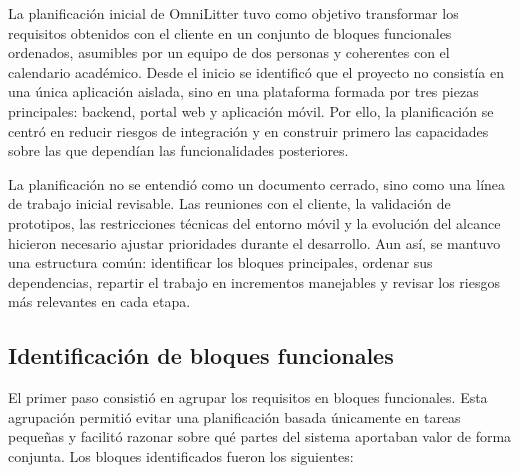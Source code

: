 La planificación inicial de OmniLitter tuvo como objetivo transformar los
requisitos obtenidos con el cliente en un conjunto de bloques funcionales
ordenados, asumibles por un equipo de dos personas y coherentes con el calendario
académico. Desde el inicio se identificó que el proyecto no consistía en una única
aplicación aislada, sino en una plataforma formada por tres piezas principales:
backend, portal web y aplicación móvil. Por ello, la planificación se centró en
reducir riesgos de integración y en construir primero las capacidades sobre las
que dependían las funcionalidades posteriores.

La planificación no se entendió como un documento cerrado, sino como una línea de
trabajo inicial revisable. Las reuniones con el cliente, la validación de
prototipos, las restricciones técnicas del entorno móvil y la evolución del alcance
hicieron necesario ajustar prioridades durante el desarrollo. Aun así, se mantuvo
una estructura común: identificar los bloques principales, ordenar sus
dependencias, repartir el trabajo en incrementos manejables y revisar los riesgos más relevantes
en cada etapa.

\subsection{Identificación de bloques funcionales}

El primer paso consistió en agrupar los requisitos en bloques funcionales. Esta
agrupación permitió evitar una planificación basada únicamente en tareas pequeñas
y facilitó razonar sobre qué partes del sistema aportaban valor de forma conjunta.
Los bloques identificados fueron los siguientes:

